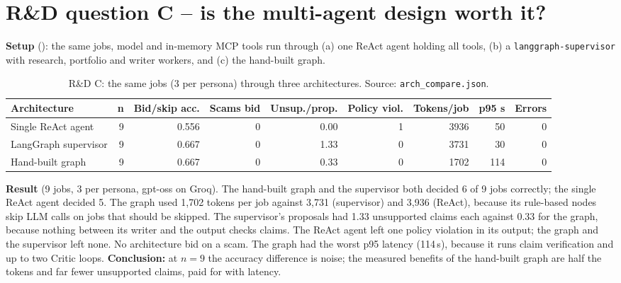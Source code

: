 \documentclass[10pt,a4paper]{article}
\newcommand{\file}[1]{\texttt{\detokenize{#1}}}
\begin{document}
\section{R\&D question C -- is the multi-agent design worth it?}
\textbf{Setup} (\file{evals/runners/arch_compare.py}): the same jobs, model and in-memory MCP tools run through (a) one ReAct agent
holding all tools, (b) a \texttt{langgraph-supervisor} with research, portfolio and writer workers, and (c) the hand-built graph.
\begin{table}[t]\centering\small\caption{R\&D C: the same jobs (3 per persona) through three architectures. Source: \texttt{arch\_compare.json}.}\label{tab:arch}
\begin{tabular}{lrrrrrrrr}\toprule Architecture & n & Bid/skip acc. & Scams bid & Unsup./prop. & Policy viol. & Tokens/job & p95 s & Errors\\\midrule
Single ReAct agent & 9 & 0.556 & 0 & 0.00 & 1 & 3936 & 50 & 0 \\
LangGraph supervisor & 9 & 0.667 & 0 & 1.33 & 0 & 3731 & 30 & 0 \\
Hand-built graph & 9 & 0.667 & 0 & 0.33 & 0 & 1702 & 114 & 0 \\
\bottomrule\end{tabular}\end{table}
\textbf{Result} (9 jobs, 3 per persona, gpt-oss on Groq). The hand-built graph and the supervisor both decided 6 of 9 jobs correctly; the
single ReAct agent decided 5. The graph used 1{,}702 tokens per job against 3{,}731 (supervisor) and 3{,}936 (ReAct), because its rule-based
nodes skip LLM calls on jobs that should be skipped. The supervisor's proposals had 1.33 unsupported claims each against 0.33 for the graph,
because nothing between its writer and the output checks claims. The ReAct agent left one policy violation in its output; the graph and
the supervisor left none. No architecture bid on a scam. The graph had the worst p95 latency (114\,s), because it runs claim
verification and up to two Critic loops. \textbf{Conclusion:} at $n=9$ the accuracy difference is noise; the measured benefits of the hand-built
graph are half the tokens and far fewer unsupported claims, paid for with latency.
\end{document}
